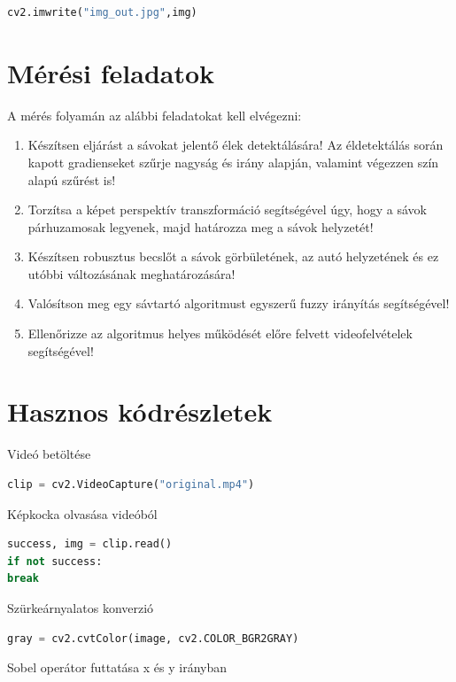 \documentclass[12pt,a4paper,oneside]{report}             %
\begin{document}
\begin{lstlisting}[language=Python]
cv2.imwrite("img_out.jpg",img)
\end{lstlisting}

\chapter{Mérési feladatok}

A mérés folyamán az alábbi feladatokat kell elvégezni:

\begin{enumerate}
\item Készítsen eljárást a sávokat jelentő élek detektálására! Az éldetektálás során kapott gradienseket szűrje nagyság és irány alapján, valamint végezzen szín alapú szűrést is!
\item Torzítsa a képet perspektív transzformáció segítségével úgy, hogy a sávok párhuzamosak legyenek, majd határozza meg a sávok helyzetét!
\item Készítsen robusztus becslőt a sávok görbületének, az autó helyzetének és ez utóbbi változásának meghatározására!
\item Valósítson meg egy sávtartó algoritmust egyszerű fuzzy irányítás segítségével!
\item Ellenőrizze az algoritmus helyes működését előre felvett videofelvételek segítségével!
\end{enumerate}

\chapter{Hasznos kódrészletek}

Videó betöltése

\begin{lstlisting}[language=Python]
clip = cv2.VideoCapture("original.mp4")
\end{lstlisting}

Képkocka olvasása videóból

\begin{lstlisting}[language=Python]
success, img = clip.read()
if not success:
break
\end{lstlisting}

Szürkeárnyalatos konverzió

\begin{lstlisting}[language=Python]
gray = cv2.cvtColor(image, cv2.COLOR_BGR2GRAY)
\end{lstlisting}

Sobel operátor futtatása x és y irányban
\end{document}
